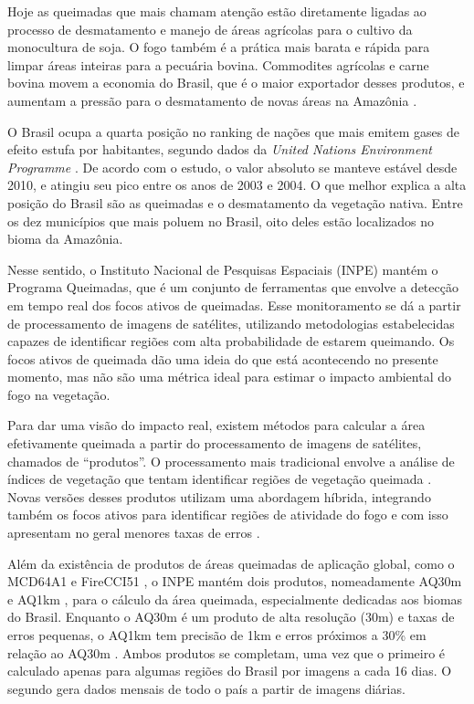 \documentclass[cic,tc]{iiufrgs}
\begin{document}
Hoje as queimadas que mais chamam atenção estão diretamente ligadas ao processo de desmatamento e manejo de áreas agrícolas para o cultivo da monocultura de soja. O fogo também é a prática mais barata e rápida para limpar áreas inteiras para a pecuária bovina. Commodites agrícolas e carne bovina movem a economia do Brasil, que é o maior exportador desses produtos, e aumentam a pressão para o desmatamento de novas áreas na Amazônia \citep{fuchs2020}.

O Brasil ocupa a quarta posição no ranking de nações que mais emitem gases de efeito estufa por habitantes, segundo dados da \textit{United Nations Environment Programme} \citet{unep2022}. De acordo com o estudo, o valor absoluto se manteve estável desde 2010, e atingiu seu pico entre os anos de 2003 e 2004. O que melhor explica a alta posição do Brasil são as queimadas e o desmatamento da vegetação nativa. Entre os dez municípios que mais poluem no Brasil, oito deles estão localizados no bioma da Amazônia.

Nesse sentido, o Instituto Nacional de Pesquisas Espaciais (INPE) mantém o Programa Queimadas, que é um conjunto de ferramentas que envolve a detecção em tempo real dos focos ativos de queimadas. Esse monitoramento se dá a partir de processamento de imagens de satélites, utilizando metodologias estabelecidas capazes de identificar regiões com alta probabilidade de estarem queimando. Os focos ativos de queimada dão uma ideia do que está acontecendo no presente momento, mas não são uma métrica ideal para estimar o impacto ambiental do fogo na vegetação.


Para dar uma visão do impacto real, existem métodos para calcular a área efetivamente queimada a partir do processamento de imagens de satélites, chamados de ``produtos''. O processamento mais tradicional envolve a análise de índices de vegetação que tentam identificar regiões de vegetação queimada \citep{pereira1999}. Novas versões desses produtos utilizam uma abordagem híbrida, integrando também os focos ativos para identificar regiões de atividade do fogo e com isso apresentam no geral menores taxas de erros \citep{BOSCHETTI2019111490}.

Além da existência de produtos de áreas queimadas de aplicação global, como o MCD64A1 \citep{GIGLIO201872} e FireCCI51 \citep{Lizundia2020}, o INPE mantém dois produtos, nomeadamente AQ30m \citep{melchiori2014landsat} e AQ1km \citep{libonati2015algorithm}, para o cálculo da área queimada, especialmente dedicadas aos biomas do Brasil. Enquanto o AQ30m é um produto de alta resolução (30m) e taxas de erros pequenas, o AQ1km tem precisão de 1km e erros próximos a 30\% em relação ao AQ30m \cite{PerguntasFrequentesINPE}. Ambos produtos se completam, uma vez que o primeiro é calculado apenas para algumas regiões do Brasil por imagens a cada 16 dias. O segundo gera dados mensais de todo o país a partir de imagens diárias.  
\end{document}

